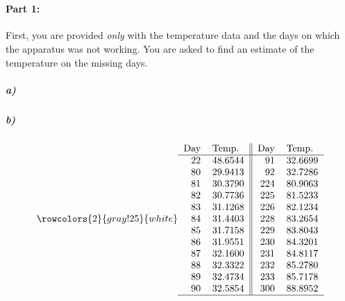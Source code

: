 \documentclass[pdftex,12pt,a4paper]{article}
\begin{document}


\vspace{2 cm}
\section*{}

\paragraph{Part 1:} First, you are provided \emph{only} with the temperature data and the days on which the apparatus was not working. You are asked to find an estimate of the temperature on the missing days. 

\subparagraph{a)} 

\subparagraph{b)} 

$$
\rowcolors{2}{gray!25}{white}
\begin{tabular}{ r  l || r  l }  
Day & Temp. & Day & Temp. \\ \hline
22 & 48.6544 & 91 & 32.6699 \\

80 & 29.9413 &  92 & 32.7286 \\

81 & 30.3790 & 224 & 80.9063 \\

82 & 30.7736 & 225 & 81.5233 \\

83 & 31.1268 & 226 & 82.1234 \\

84 & 31.4403 & 228 & 83.2654 \\

85 & 31.7158 & 229 & 83.8043 \\

86 & 31.9551 & 230 & 84.3201 \\

87 & 32.1600 & 231 & 84.8117 \\

88 & 32.3322 & 232 & 85.2780 \\

89 & 32.4734 & 233 & 85.7178 \\

90 & 32.5854 & 300 & 88.8952 \\ \hline
\end{tabular}
$$

\section*{}
\end{document}

